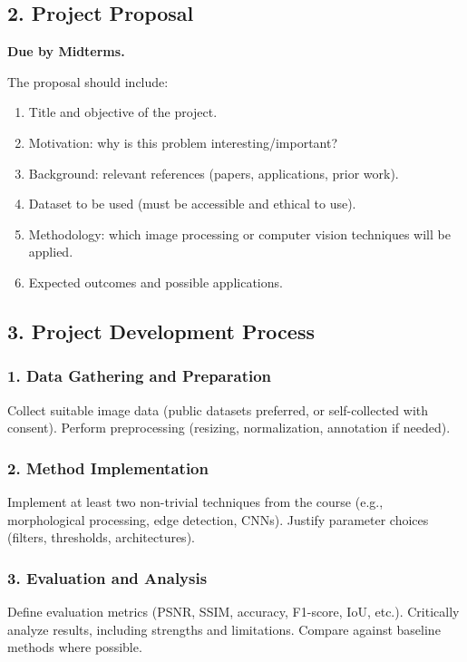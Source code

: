 \documentclass[a4paper,10pt]{article}
\begin{document}
\subsection*{2. Project Proposal}
\textbf{Due by Midterms.}

\noindent The proposal should include:
\begin{enumerate}
    \item Title and objective of the project.
    \item Motivation: why is this problem interesting/important?
    \item Background: relevant references (papers, applications, prior work).
    \item Dataset to be used (must be accessible and ethical to use).
    \item Methodology: which image processing or computer vision techniques will be applied.
    \item Expected outcomes and possible applications.
\end{enumerate}

\subsection*{3. Project Development Process}

\subsubsection*{1. Data Gathering and Preparation}
Collect suitable image data (public datasets preferred, or self-collected with consent). Perform preprocessing (resizing, normalization, annotation if needed).

\subsubsection*{2. Method Implementation}
Implement at least two non-trivial techniques from the course (e.g., morphological processing, edge detection, CNNs). Justify parameter choices (filters, thresholds, architectures).

\subsubsection*{3. Evaluation and Analysis}
Define evaluation metrics (PSNR, SSIM, accuracy, F1-score, IoU, etc.). Critically analyze results, including strengths and limitations. Compare against baseline methods where possible.
\end{document}
